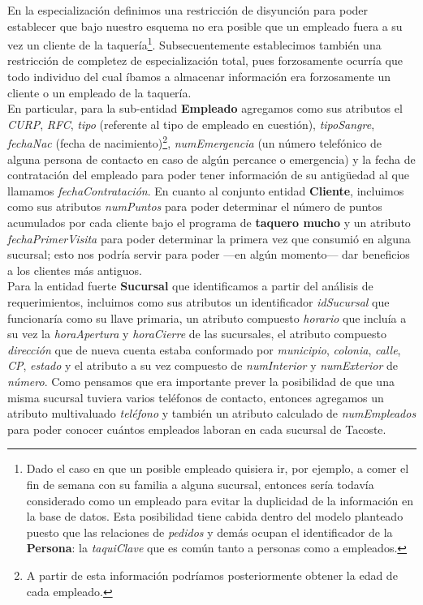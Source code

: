 \documentclass[11pt,letterpaper]{article}
\begin{document}
\newpage 
En la especialización definimos una restricción de disyunción para poder establecer que bajo nuestro esquema no era posible que un empleado fuera a su vez un cliente de la taquería\footnote{Dado el caso en que un posible empleado quisiera ir, por ejemplo, a comer el fin de semana con su familia a alguna sucursal, entonces sería todavía considerado como un empleado para evitar la duplicidad de la información en la base de datos. Esta posibilidad tiene cabida dentro del modelo planteado puesto que las relaciones de \textit{pedidos} y demás ocupan el identificador de la \textbf{Persona}: la \textit{taquiClave} que es común tanto a personas como a empleados.}. Subsecuentemente establecimos también una restricción de completez de especialización total, pues forzosamente ocurría que todo individuo del cual íbamos a almacenar información era forzosamente un cliente o un empleado de la taquería.\\


En particular, para la sub-entidad \textbf{Empleado} agregamos como sus atributos el \textit{CURP}, \textit{RFC}, \textit{tipo} (referente al tipo de empleado en cuestión), \textit{tipoSangre}, \textit{fechaNac} (fecha de nacimiento)\footnote{A partir de esta información podríamos posteriormente obtener la edad de cada empleado.}, \textit{numEmergencia} (un número telefónico de alguna persona de contacto en caso de algún percance o emergencia) y la fecha de contratación del empleado para poder tener información de su antigüedad al que llamamos \textit{fechaContratación}. 
En cuanto al conjunto entidad \textbf{Cliente}, incluimos como sus atributos \textit{numPuntos} para poder determinar el número de puntos acumulados por cada cliente bajo el programa de \textbf{taquero mucho} y un atributo \textit{fechaPrimerVisita} para poder determinar la primera vez que consumió en alguna sucursal; esto nos podría servir para poder ---en algún momento--- dar beneficios a los clientes más antiguos.\\

Para la entidad fuerte \textbf{Sucursal} que identificamos a partir del análisis de requerimientos, incluimos como sus atributos un identificador \textit{idSucursal} que funcionaría como su llave primaria, un atributo compuesto \textit{horario} que incluía a su vez la \textit{horaApertura} y \textit{horaCierre} de las sucursales, el atributo compuesto \textit{dirección} que de nueva cuenta estaba conformado por \textit{municipio}, \textit{colonia}, \textit{calle}, \textit{CP}, \textit{estado} y el atributo a su vez compuesto de \textit{numInterior} y \textit{numExterior} de \textit{número}. Como pensamos que era importante prever la posibilidad de que una misma sucursal tuviera varios teléfonos de contacto, entonces agregamos un atributo multivaluado \textit{teléfono} y también un atributo calculado de \textit{numEmpleados} para poder conocer cuántos empleados laboran en cada sucursal de Tacoste.\\
\end{document}
